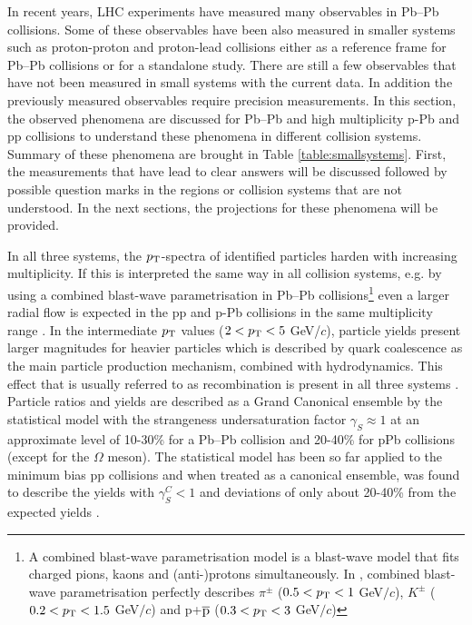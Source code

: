 \documentclass[../report.tex]{subfiles}
\begin{document}
In recent years, LHC experiments have measured many observables in Pb--Pb collisions. Some of these observables have been also measured in smaller systems such as proton-proton and proton-lead collisions either as a reference frame for Pb--Pb collisions or for a standalone study. There are still a few observables that have not been measured in small systems with the current data. In addition the previously measured observables require precision measurements. In this section, the observed phenomena are discussed for Pb--Pb and high multiplicity p-Pb and pp collisions to understand these phenomena in different collision systems. Summary of these phenomena are brought in Table \ref{table:smallsystems}. First, the measurements that have lead to clear answers will be discussed followed by possible question marks in the regions or collision systems that are not understood. In the next sections, the projections for these phenomena will be provided. 

In all three systems, the $p_{\rm{T}}$-spectra of identified particles harden with increasing multiplicity. If this is interpreted the same way in all collision systems, e.g. by using a  combined blast-wave parametrisation in Pb--Pb collisions\footnote{A combined blast-wave parametrisation model is a blast-wave model that fits charged pions, kaons and (anti-)protons simultaneously. In \cite{Abelev:2012wca}, combined blast-wave parametrisation perfectly describes $\pi^{\pm}$ ($ 0.5 < p_{\rm{T}} < 1$ GeV$/c$), $K^{\pm}$ ($ 0.2 < p_{\rm{T}} < 1.5$ GeV$/c$) and p+$\overline{\rm{p}}$ ($ 0.3 < p_{\rm{T}} < 3$ GeV$/c$)} even a larger radial flow is expected in the pp and p-Pb collisions in the same multiplicity range \cite{Shuryak:2013ke}. In the intermediate $p_{\rm{T}}$ values ($2 < p_{\rm{T}} < 5 $ GeV/$c$), particle yields present larger magnitudes for heavier particles which is described by quark coalescence as the main particle production mechanism, combined with hydrodynamics. This effect that is usually referred to as recombination is present in all three systems \cite{Andrei:2014vaa,Abelev:2013xaa,Abelev:2013haa,Abelev:2014uua,Khachatryan:2016yru,Adam:2015jca,Adam:2016dau,Adam:2017zbf}. Particle ratios and yields are described as a Grand Canonical ensemble by the statistical model with the strangeness undersaturation factor $\gamma_{S}\approx 1$ at an approximate level of 10-30\% for a Pb--Pb collision and 20-40\% for pPb collisions (except for the $\Omega$ meson). The statistical model has been so far applied to the minimum bias pp collisions and when treated as a canonical ensemble, was found to describe the yields with $\gamma^{C}_{S} < 1$ and deviations of only about 20-40\% from the expected yields \cite{Adam:2016emw,Adam:2016bpr,Adam:2015vsf,ABELEV:2013zaa}. 
\end{document}
